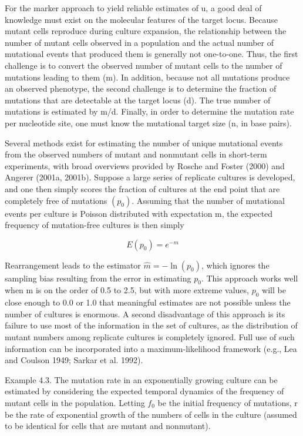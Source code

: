 \documentclass{article}
\begin{document}
For the marker approach to yield reliable estimates of u, a good deal of knowledge must exist on the molecular features of the target locus. Because mutant cells reproduce during culture expansion, the relationship between the number of mutant cells observed in a population and the actual number of mutational events that produced them is generally not one-to-one. Thus, the first challenge is to convert the observed number of mutant cells to the number of mutations leading to them (m). In addition, because not all mutations produce an observed phenotype, the second challenge is to determine the fraction of mutations that are detectable at the target locus (d). The true number of mutations is estimated by m/d. Finally, in order to determine the mutation rate per nucleotide site, one must know the mutational target size (n, in base pairs).

Several methods exist for estimating the number of unique mutational events from the observed numbers of mutant and nonmutant cells in short-term experiments, with broad overviews provided by Rosche and Foster (2000) and Angerer (2001a, 2001b). Suppose a large series of replicate cultures is developed, and one then simply scores the fraction of cultures at the end point that are completely free of mutations  $ (p_{0}) $. Assuming that the number of mutational events per culture is Poisson distributed with expectation m, the expected frequency of mutation-free cultures is then simply

\begin{equation}
E(p_{0})=e^{-m}
\tag{4.21}
\label{eq:4_21}
\end{equation}

Rearrangement leads to the estimator  $ \widehat{m} = -\ln(p_0) $, which ignores the sampling bias resulting from the error in estimating  $ p_0 $. This approach works well when m is on the order of 0.5 to 2.5, but with more extreme values,  $ p_0 $ will be close enough to 0.0 or 1.0 that meaningful estimates are not possible unless the number of cultures is enormous. A second disadvantage of this approach is its failure to use most of the information in the set of cultures, as the distribution of mutant numbers among replicate cultures is completely ignored. Full use of such information can be incorporated into a maximum-likelihood framework (e.g., Lea and Coulson 1949; Sarkar et al. 1992).

Example 4.3. The mutation rate in an exponentially growing culture can be estimated by considering the expected temporal dynamics of the frequency of mutant cells in the population. Letting  $ f_{0} $ be the initial frequency of mutations, r be the rate of exponential growth of the numbers of cells in the culture (assumed to be identical for cells that are mutant and nonmutant).
\end{document}
